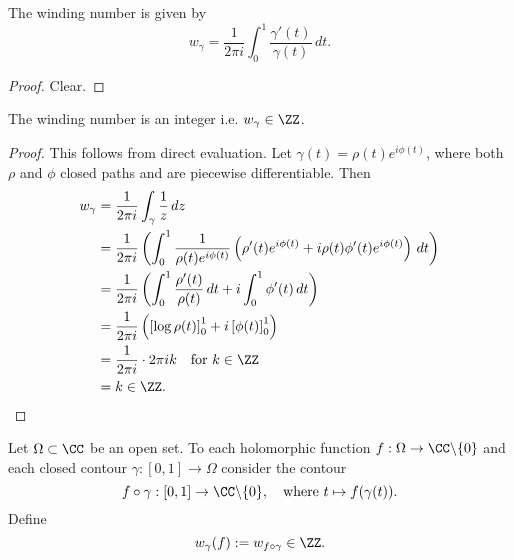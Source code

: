 \documentclass[12pt, a4paper]{article}
\begin{document}

\begin{corollary}
    The winding number is given by 
    \[w_{\gamma} =\frac{1}{2\pi i} \int_0^1 \frac{\gamma'(t)}{\gamma(t)} \, dt.\]
\end{corollary}

\begin{proof}
    Clear.
\end{proof}

\begin{mdprop}
    The winding number is an integer i.e. \(w_{\gamma} \in \ZZ\).
\end{mdprop}

\begin{proof}
    This follows from direct evaluation. Let \(\gamma(t) = \rho(t) e^{i\phi(t)}\), where both \(\rho\) and \(\phi\) closed paths and are piecewise differentiable. Then 
    \[\begin{aligned}
        w_{\gamma} &= \frac{1}{2\pi i} \int_{\gamma} \frac{1}{z} \, dz\\
        &= \frac{1}{2\pi i} \left( \int_0^1 \frac{1}{\rho(t) e^{i\phi(t)}} \left( \rho'(t)e^{i\phi(t)}+i\rho(t)\phi'(t)e^{i\phi(t)} \right) \, dt \right) \\
        &= \frac{1}{2\pi i} \left( \int_{0}^{1} \frac{\rho'(t)}{\rho(t)} \, dt + i \int_{0}^{1} \phi'(t) \, dt \right) \\
        &= \frac{1}{2\pi i}\left( \left[ \log\rho(t) \right]_0^1+ i \left[ \phi(t) \right]_0^1 \right) \\
        &= \frac{1}{2\pi i} \cdot 2\pi i k \quad \text{for } k \in \ZZ \\
        &= k \in \ZZ.
    \end{aligned}\]
\end{proof}

\begin{definition}
    Let \(\Omega \subset \CC\) be an open set. To each holomorphic function \(f: \Omega \to \CC \backslash \{0\}\) and each closed contour \(\gamma:[0,1] \to \Omega\) consider the contour 
    \[f \circ \gamma: [0,1] \to \CC \backslash \{0\}, \quad \text{where } t \mapsto f(\gamma(t)).\]
    Define 
    \[w_{\gamma}(f) := w_{f \circ \gamma} \in \ZZ.\]
\end{definition}
\end{document}
